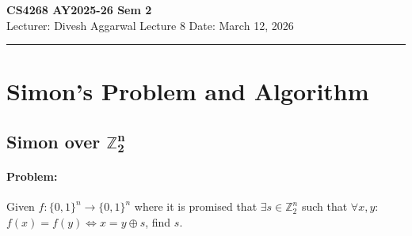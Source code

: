 \noindent
\textbf{CS4268 AY2025-26 Sem 2}
\\
\noindent
Lecturer: Divesh Aggarwal
\hfill
Lecture 8                      %
\hfill
Date: March 12, 2026          %


\noindent
\rule{\textwidth}{1pt}

\medskip


\section{Simon's Problem and Algorithm}

\subsection[\texorpdfstring{Simon over $\bm{\mathbb{Z}_2^n}$}{}]{Simon over $\bm{\mathbb{Z}_2^n}$} 

\paragraph{Problem:} Given $f: \{0,1\}^n \rightarrow \{0,1\}^n$ where it is promised that $\exists s \in \mathbb{Z}_2^n$ such that $\forall x,y$: $f(x)=f(y) \iff x=y\oplus s$, find $s$. 

